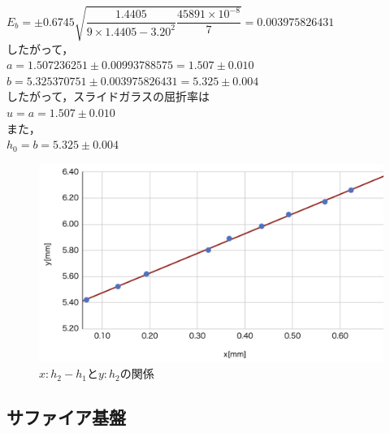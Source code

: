 \documentclass[a4paper,1pt]{jsarticle}
\begin{document}
$E_b=\pm0.6745\sqrt{\dfrac{1.4405}{9\times1.4405-3.20^2}\dfrac{45891\times10^{-8}}{7}}=0.003975826431$\\

したがって，\\

$a=1.507236251\pm0.00993788575=1.507\pm0.010$\\

$b=5.325370751\pm0.003975826431=5.325\pm0.004$\\

したがって，スライドガラスの屈折率は\\

$u=a=1.507\pm0.010$\\

また，\\

$h_0=b=5.325\pm0.004$\\


\begin{figure}[h]
  \begin{center}
  \includegraphics[width=150mm]{actA.png}
  \caption{$x:h_2-h_1とy:h_2の関係$}
  \end{center}
\end{figure}
  

\clearpage


\subsection[short]{サファイア基盤}
\end{document}
